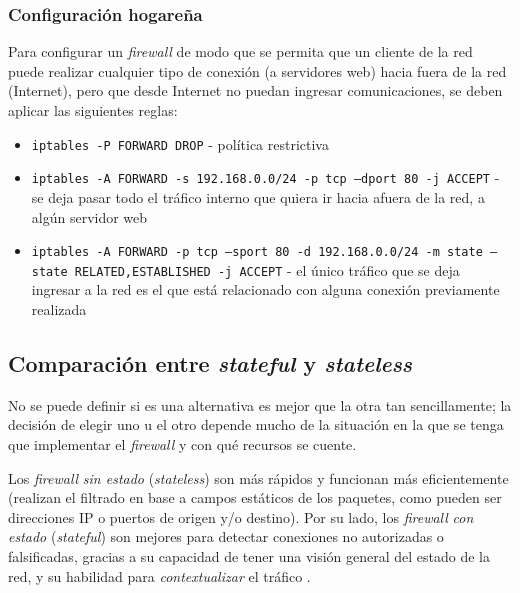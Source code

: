 \subsubsection*{Configuración hogareña}

Para configurar un \emph{firewall} de modo que se permita que un cliente de la red puede realizar cualquier tipo de conexión (a servidores web) hacia fuera de la red (Internet), pero que desde Internet no puedan ingresar comunicaciones, se deben aplicar las siguientes reglas:

\begin{itemize}
    \item \texttt{iptables -P FORWARD DROP} - política restrictiva 
    \item \texttt{iptables -A FORWARD -s 192.168.0.0/24 -p tcp --dport 80 -j ACCEPT} - se deja pasar todo el tráfico interno que quiera ir hacia afuera de la red, a algún servidor web
    \item \texttt{iptables -A FORWARD -p tcp --sport 80 -d 192.168.0.0/24 -m state --state RELATED,ESTABLISHED -j ACCEPT} - el único tráfico que se deja ingresar a la red es el que está relacionado con alguna conexión previamente realizada  
\end{itemize}


\subsection{Comparación entre \emph{stateful} y \emph{stateless}}

No se puede definir si es una alternativa es mejor que la otra tan sencillamente; la decisión de elegir uno u el otro depende mucho de la situación en la que se tenga que implementar el \emph{firewall} y con qué recursos se cuente.

    Los \emph{firewall} \emph{sin estado} (\emph{stateless}) son más rápidos y funcionan más eficientemente (realizan el filtrado en base a campos estáticos de los paquetes, como pueden ser direcciones IP o puertos de origen y/o destino). Por su lado, los \emph{firewall} \emph{con estado} (\emph{stateful}) son mejores para detectar conexiones no autorizadas o falsificadas, gracias a su capacidad de tener una visión general del estado de la red, y su habilidad para \emph{contextualizar} el tráfico \autocite{FirewallStatelessVsStateful}. 



\clearpage
\printbibliography

